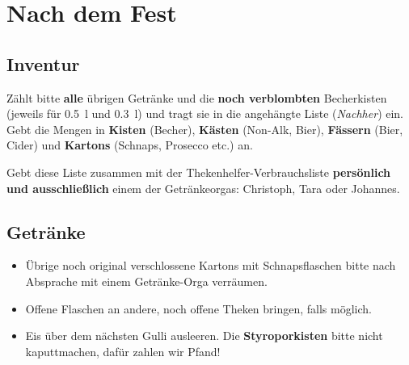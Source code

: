 \section{Nach dem Fest}
\subsection{Inventur}
Zählt bitte \textbf{alle} übrigen Getränke und die \textbf{noch verblombten} Becherkisten (jeweils für \SI{0.5}{\litre} und \SI{0.3}{\litre}) und tragt sie in die angehängte Liste (\emph{Nachher}) ein. Gebt die Mengen in \textbf{Kisten} (Becher), \textbf{Kästen} (Non-Alk, Bier), \textbf{Fässern} (Bier, Cider) und \textbf{Kartons} (Schnaps, Prosecco etc.) an.

Gebt diese Liste zusammen mit der Thekenhelfer-Verbrauchsliste \textbf{persönlich und ausschließlich} einem der Getränkeorgas: Christoph, Tara oder Johannes.
\subsection{Getränke}
\begin{itemize}
  \item Übrige noch original verschlossene Kartons mit Schnapsflaschen bitte nach Absprache mit einem Getränke-Orga verräumen.
  \item Offene Flaschen an andere, noch offene Theken bringen, falls möglich.
  \item Eis über dem nächsten Gulli ausleeren. Die \textbf{Styroporkisten} bitte nicht kaputtmachen, dafür zahlen wir Pfand!
\end{itemize}
